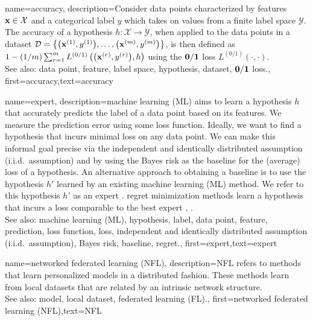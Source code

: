 {name={accuracy},
	description={Consider data points characterized by features ${\bf x} \in \mathcal{X}$ and 
		a categorical label $y$ which takes on values from a finite label space $\mathcal{Y}$. The 
		accuracy of a hypothesis $h: \mathcal{X} \rightarrow \mathcal{Y}$, when applied 
		to the data points in a dataset $\mathcal{D} = \big\{ \big({\bf x}^{(1)}, y^{(1)} \big), \ldots, \big({\bf x}^{(m)},y^{(m)}\big) \big\}$, 
		is then defined as $1 - (1/m)\sum_{r=1}^{m} L^{(0/1)}\left(\big({\bf x}^{(r)},y^{(r)}\big),h \right)$ using the $\bf 0/1$ loss $L^{(0/1)}\left(\cdot,\cdot \right)$.
					\\ 
		See also: data point, feature, label space, hypothesis, dataset, $\bf 0/1$ loss.},
	first={accuracy},text={accuracy} 
}





{name={expert},
	description={machine learning (ML) aims to learn a hypothesis $h$ that accurately predicts the label 
		of a data point based on its features. We measure the prediction error using 
		some loss function. Ideally, we want to find a hypothesis that incurs minimal loss 
		on any data point. We can make this informal goal precise via the independent and identically distributed assumption (i.i.d.\ assumption) 
		and by using the Bayes risk as the baseline for the (average) loss of a hypothesis. 
		An alternative approach to obtaining a baseline is to use the hypothesis $h'$ learned 
		by an existing machine learning (ML) method. We refer to this hypothesis $h'$ as an expert \cite{PredictionLearningGames}. \Gls{regret} minimization methods learn a hypothesis
		that incurs a loss comparable to the best expert \cite{PredictionLearningGames}, \cite{HazanOCO}.
					\\ 
		See also: machine learning (ML), hypothesis, label, data point, feature, prediction, loss function, loss, independent and identically distributed assumption (i.i.d.\ assumption), Bayes risk, baseline, regret.},
	first={expert},text={expert} 
}

{name={networked federated learning (NFL)},
	description={NFL refers 
		to methods that learn personalized models in a distributed fashion. These methods learn from local datasets 
		that are related by an intrinsic network structure.
					\\ 
		See also: model, local dataset, federated learning (FL).},
 first={networked federated learning (NFL)},text={NFL} 
}




